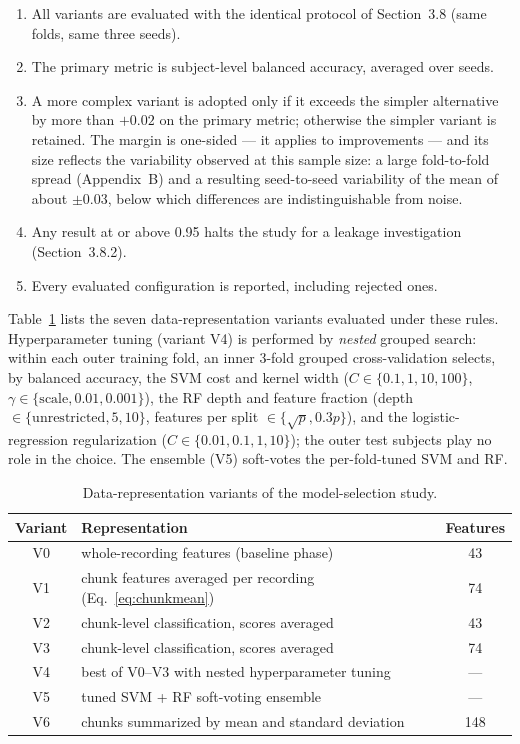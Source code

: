 \begin{enumerate}
  \item All variants are evaluated with the identical protocol of
        Section~3.8 (same folds, same three seeds).
  \item The primary metric is subject-level balanced accuracy, averaged
        over seeds.
  \item A more complex variant is adopted only if it exceeds the
        simpler alternative by more than $+0.02$ on the primary
        metric; otherwise the simpler variant is retained. The margin
        is one-sided --- it applies to improvements --- and its size
        reflects the variability observed at this sample size: a large
        fold-to-fold spread (Appendix~B) and a resulting seed-to-seed
        variability of the mean of about $\pm 0.03$, below which
        differences are indistinguishable from noise.
  \item Any result at or above 0.95 halts the study for a leakage
        investigation (Section~3.8.2).
  \item Every evaluated configuration is reported, including rejected
        ones.
\end{enumerate}

Table~\ref{tab:variants} lists the seven data-representation variants
evaluated under these rules. Hyperparameter tuning (variant V4) is
performed by \emph{nested} grouped search: within each outer training
fold, an inner 3-fold grouped cross-validation selects, by balanced
accuracy, the SVM cost and kernel width
($C \in \{0.1, 1, 10, 100\}$,
$\gamma \in \{\text{scale}, 0.01, 0.001\}$), the RF depth and feature
fraction (depth $\in \{\text{unrestricted}, 5, 10\}$, features per
split $\in \{\sqrt{p}, 0.3p\}$), and the logistic-regression
regularization ($C \in \{0.01, 0.1, 1, 10\}$); the outer test subjects
play no role in the choice. The ensemble (V5) soft-votes the
per-fold-tuned SVM and RF.

\begin{table}[htb]
\centering
\caption{Data-representation variants of the model-selection study.}
\label{tab:variants}
\begin{tabular}{clc}
\toprule
Variant & Representation & Features \\
\midrule
V0 & whole-recording features (baseline phase) & 43 \\
V1 & chunk features averaged per recording (Eq.~\ref{eq:chunkmean}) & 74 \\
V2 & chunk-level classification, scores averaged & 43 \\
V3 & chunk-level classification, scores averaged & 74 \\
V4 & best of V0--V3 with nested hyperparameter tuning & --- \\
V5 & tuned SVM + RF soft-voting ensemble & --- \\
V6 & chunks summarized by mean and standard deviation & 148 \\
\bottomrule
\end{tabular}
\end{table}

